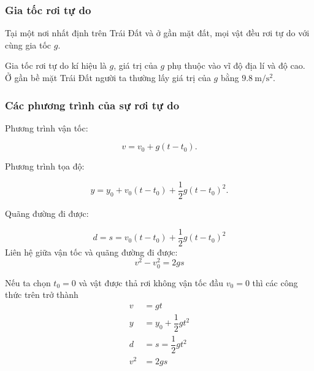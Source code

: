 \subsubsection{Gia tốc rơi tự do}
Tại một nơi nhất định trên Trái Đất và ở gần mặt đất, mọi vật đều rơi tự do với cùng gia tốc $g$.

Gia tốc rơi tự do kí hiệu là $g$, giá trị của $g$ phụ thuộc vào vĩ độ địa lí và độ cao. Ở gần bề mặt Trái Đất người ta thường lấy giá trị của $g$ bằng $\SI{9.8}{\meter/\second^2}$.
\subsubsection{Các phương trình của sự rơi tự do}

Phương trình vận tốc:

\begin{equation*}
	v = v_0+g(t -t_0).
\end{equation*}

Phương trình tọa độ:

\begin{equation*}
	y = y_0 +v_0(t-t_0)+ \dfrac{1}{2}g(t -t_0)^2.
\end{equation*}

Quãng đường đi được:

\begin{equation*}
	d= s = v_0(t-t_0)+\dfrac{1}{2} g (t-t_0)^2
\end{equation*}
Liên hệ giữa vận tốc và quãng đường đi được:
$$v^2-v^2_0=2gs$$

Nếu ta chọn $t_{0}=0$ và vật được thả rơi không vận tốc đầu $v_0=0$ thì các công thức trên trở thành
\begin{align*}
	v&=gt\\	
	y&=y_0+\dfrac{1}{2}gt^{2}\\
	d&=s=\dfrac{1}{2}gt^{2}\\
	v^2&=2gs
\end{align*}



